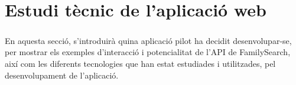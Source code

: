 \chapter{Estudi tècnic de l'aplicació web}

    \paragraph{}
    En aquesta secció, s’introduirà quina aplicació pilot ha decidit desenvolupar-se, per mostrar els exemples d’interacció i potencialitat de l’API de FamilySearch, així com les diferents tecnologies que han estat estudiades i utilitzades, pel desenvolupament de l'aplicació.

    
    
    
